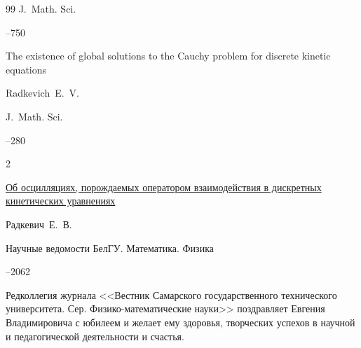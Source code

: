 \begin{thebibliography}{99}
\jour J.~Math. Sci.




--750







\paper  The existence of global solutions to the Cauchy problem for discrete kinetic equations 

\by Radkevich~E.~V.

\jour J.~Math. Sci.




--280

2






\paper   \href{https://elibrary.ru/item.asp?id=17951625}{Об осцилляциях, порождаемых оператором взаимодействия в дискретных кинетических уравнениях}

\by Радкевич~Е.~В.

\jour Научные ведомости БелГУ. Математика. Физика




--2062





\end{thebibliography}





\vfill



Редколлегия журнала <<Вестник Самарского государственного технического университета. Сер. Физико-математические науки>> поздравляет Евгения Владимировича с юбилеем и желает ему здоровья, творческих успехов в научной и педагогической деятельности и счастья.







\vfill







